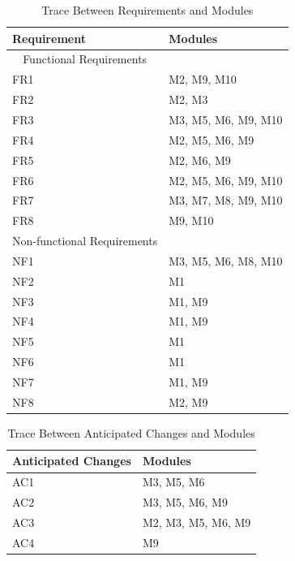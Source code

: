 \documentclass[12pt,fleqn]{article}
\begin{document}
\begin{table}[H]
\centering
\caption{Trace Between Requirements and Modules}
\label{table:reqmodules}
\begin{tabular}{p{} p{}}
\toprule
        Requirement & Modules \\
        \midrule
        \multicolumn{1}{c}{Functional Requirements} \\
        \midrule
        FR1 & M2, M9, M10 \\
        FR2 & M2, M3 \\
        FR3 & M3, M5, M6, M9, M10 \\
        FR4 & M2, M5, M6, M9 \\
        FR5 & M2, M6, M9 \\
        FR6 & M2, M5, M6, M9, M10 \\
        FR7 & M3, M7, M8, M9, M10 \\
        FR8 & M9, M10 \\
        \midrule
        \multicolumn{1}{c}{Non-functional Requirements} \\
        \midrule
        NF1 & M3, M5, M6, M8, M10 \\
        NF2 & M1 \\
        NF3 & M1, M9 \\
        NF4 & M1, M9 \\
        NF5 & M1 \\
        NF6 & M1 \\
        NF7 & M1, M9 \\
        NF8 & M2, M9 \\
        \bottomrule
\end{tabular}
\end{table}

\begin{table}[H]
\centering
\caption{Trace Between Anticipated Changes and Modules}
\label{table:reqmodules}
\begin{tabular}{p{} p{}}
\toprule
        Anticipated Changes & Modules \\
        \midrule
        AC1 & M3, M5, M6 \\
        AC2 & M3, M5, M6, M9 \\
        AC3 & M2, M3, M5, M6, M9 \\
        AC4 & M9 \\
        \bottomrule
\end{tabular}
\end{table}
\end{document}
